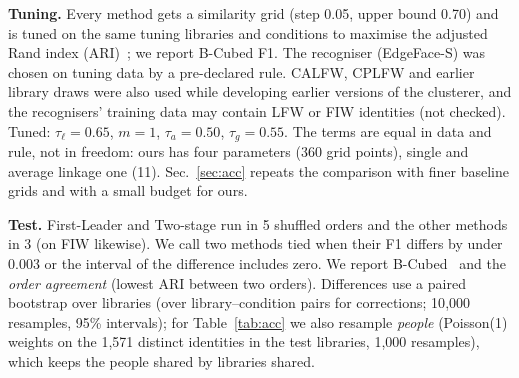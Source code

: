 \documentclass[conference]{IEEEtran}
\begin{document}
\textbf{Tuning.} Every method gets a similarity grid (step 0.05, upper bound 0.70) and is tuned on the
same tuning libraries and conditions to maximise the adjusted Rand index (ARI)~\cite{hubert1985ari}; we report B-Cubed F1. The recogniser (EdgeFace-S) was
chosen on tuning data by a pre-declared rule. CALFW, CPLFW and earlier library draws were also used while developing earlier versions of the clusterer, and the recognisers' training data may contain LFW or FIW identities (not checked).
Tuned: $\tau_\ell=0.65$, $m=1$, $\tau_a=0.50$, $\tau_g=0.55$. The terms are equal in data and rule, not in
freedom: ours has four parameters (360 grid points), single and average linkage one (11). Sec.~\ref{sec:acc} repeats the
comparison with finer baseline grids and with a small budget for ours.

\textbf{Test.} First-Leader and Two-stage run in 5 shuffled orders and the other methods in 3 (on FIW likewise). We call two methods tied when their F1 differs by under 0.003 or the interval of the difference includes zero. We report B-Cubed~\cite{bagga1998entity,amigo2009bcubed} and
the \emph{order agreement} (lowest ARI between two orders). Differences use a paired bootstrap over libraries (over
library--condition pairs for corrections; 10{,}000 resamples, 95\% intervals); for Table~\ref{tab:acc} we also resample
\emph{people} (Poisson(1) weights on the 1{,}571 distinct identities in the test libraries, 1{,}000 resamples), which keeps the people shared by libraries shared.
\end{document}
